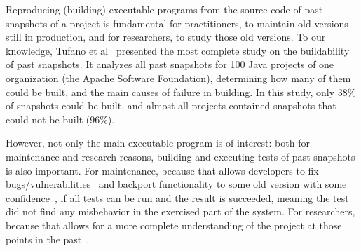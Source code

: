 
Reproducing (building) executable programs from the source code of past snapshots of a project is fundamental for practitioners, to maintain old versions still in production, and for researchers, to study those old versions. 
To our knowledge, Tufano et al~\cite{tufano2017there} presented the most complete study on the buildability of past snapshots.
It analyzes all past snapshots for 100 Java projects of one organization (the Apache Software Foundation), determining how many of them could be built, and the main causes of failure in building. In this study, only 38\% of snapshots could be built, and almost all projects contained snapshots that could not be built (96\%).

However, not only the main executable program is of interest: both for maintenance and research reasons, building and executing tests of past snapshots is also important. 
For maintenance, because that allows developers to fix bugs/vulnerabilities~\cite{bartelsoftware} and backport functionality to some old version with some confidence~\cite{tian2017mining}, if all tests can be run and the result is succeeded, meaning the test did not find any misbehavior in the exercised part of the system. 
For researchers, because that allows for a more complete understanding of the project at those points in the past~\cite{santos2019mind}.


